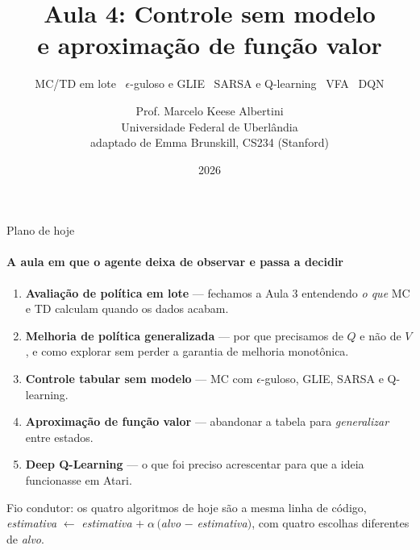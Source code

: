 \documentclass[aspectratio=169, 11pt]{beamer}
\title[Aula 4 — Controle sem modelo]{Aula 4: Controle sem modelo\\ e aproximação de função valor}
\subtitle[Aprendizagem por Reforço]{MC/TD em lote \textbullet\ $\epsilon$-guloso e GLIE \textbullet\ SARSA e Q-learning \textbullet\ VFA \textbullet\ DQN}
\author[Prof. Marcelo K. Albertini]{Prof. Marcelo Keese Albertini \\
  \footnotesize Universidade Federal de Uberlândia \\
  \footnotesize adaptado de Emma Brunskill, CS234 (Stanford)}
\institute{Universidade Federal de Uberlândia}
\date{2026}
\begin{document}
\begin{frame}\titlepage\end{frame}

\begin{frame}{Plano de hoje}
  \framesubtitle{A aula em que o agente deixa de observar e passa a decidir}

  \begin{enumerate}\setlength{\itemsep}{0.55ex}
    \item \textbf{Avaliação de política em lote} — fechamos a Aula 3
      entendendo \emph{o que} MC e TD calculam quando os dados acabam.
    \item \textbf{Melhoria de política generalizada} — por que precisamos
      de $Q$ e não de $V$, e como explorar sem perder a garantia de
      melhoria monotônica.
    \item \textbf{Controle tabular sem modelo} — MC com $\epsilon$-guloso,
      GLIE, SARSA e Q-learning.
    \item \textbf{Aproximação de função valor} — abandonar a tabela para
      \emph{generalizar} entre estados.
    \item \textbf{Deep Q-Learning} — o que foi preciso acrescentar para
      que a ideia funcionasse em Atari.
  \end{enumerate}

  \begin{ideiabox}
    Fio condutor: os quatro algoritmos de hoje são a mesma linha de código,
    $\;$\emph{estimativa} $\leftarrow$ \emph{estimativa} $+\;\alpha\,($\emph{alvo} $-$ \emph{estimativa}$)$,
    com quatro escolhas diferentes de \emph{alvo}.
  \end{ideiabox}
\end{frame}
\end{document}
